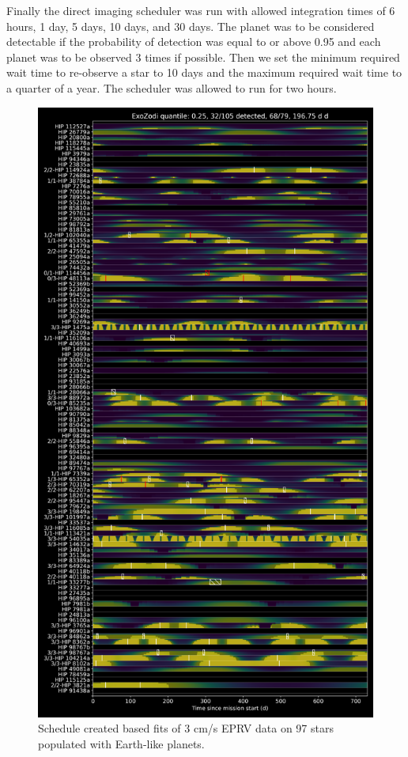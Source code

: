 Finally the direct imaging scheduler was run with allowed integration times
of 6 hours, 1 day, 5 days, 10 days, and 30 days. The planet was to be considered
detectable if the probability of detection was equal to or above 0.95 and each
planet was to be observed 3 times if possible. Then we set the minimum required
wait time to re-observe a star to 10 days and the maximum required wait time to
a quarter of a year. The scheduler was allowed to run for two hours.

\begin{figure}
  \begin{center}
    \includegraphics[height=0.9\textheight]{ch4/figures/schedule.png}
  \end{center}
  \caption{
    Schedule created based fits of 3 cm/s EPRV data on 97 stars populated with
    Earth-like planets.
  }
  \label{fig:schedule}
\end{figure}

